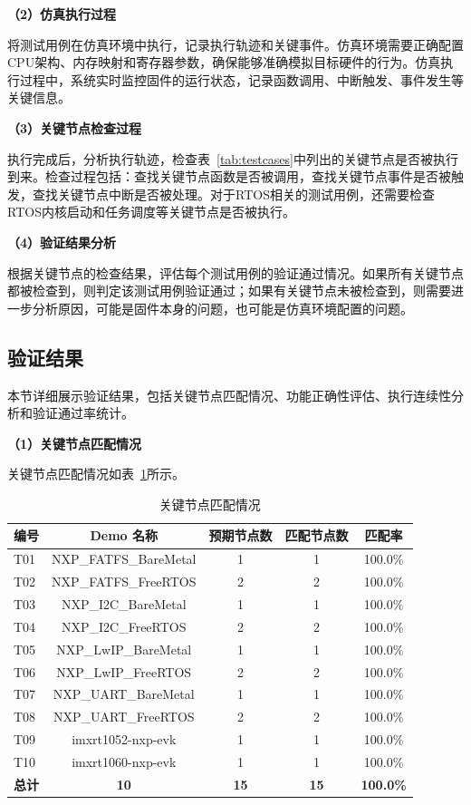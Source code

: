 \textbf{（2）仿真执行过程}

将测试用例在仿真环境中执行，记录执行轨迹和关键事件。仿真环境需要正确配置CPU架构、内存映射和寄存器参数，确保能够准确模拟目标硬件的行为。仿真执行过程中，系统实时监控固件的运行状态，记录函数调用、中断触发、事件发生等关键信息。

\textbf{（3）关键节点检查过程}

执行完成后，分析执行轨迹，检查表~\ref{tab:testcases}中列出的关键节点是否被执行到来。检查过程包括：查找关键节点函数是否被调用，查找关键节点事件是否被触发，查找关键节点中断是否被处理。对于RTOS相关的测试用例，还需要检查RTOS内核启动和任务调度等关键节点是否被执行。

\textbf{（4）验证结果分析}

根据关键节点的检查结果，评估每个测试用例的验证通过情况。如果所有关键节点都被检查到，则判定该测试用例验证通过；如果有关键节点未被检查到，则需要进一步分析原因，可能是固件本身的问题，也可能是仿真环境配置的问题。

\subsection{验证结果}

本节详细展示验证结果，包括关键节点匹配情况、功能正确性评估、执行连续性分析和验证通过率统计。

\textbf{（1）关键节点匹配情况}

关键节点匹配情况如表~\ref{tab:match_results}所示。

\begin{table}[htbp]
\centering
\caption{关键节点匹配情况}
\label{tab:match_results}
\begin{tabular}{lcccc}
\toprule
\textbf{编号} & \textbf{Demo 名称} & \textbf{预期节点数} & \textbf{匹配节点数} & \textbf{匹配率} \\
\midrule
T01 & NXP\_FATFS\_BareMetal & 1 & 1 & 100.0\% \\
T02 & NXP\_FATFS\_FreeRTOS & 2 & 2 & 100.0\% \\
T03 & NXP\_I2C\_BareMetal & 1 & 1 & 100.0\% \\
T04 & NXP\_I2C\_FreeRTOS & 2 & 2 & 100.0\% \\
T05 & NXP\_LwIP\_BareMetal & 1 & 1 & 100.0\% \\
T06 & NXP\_LwIP\_FreeRTOS & 2 & 2 & 100.0\% \\
T07 & NXP\_UART\_BareMetal & 1 & 1 & 100.0\% \\
T08 & NXP\_UART\_FreeRTOS & 2 & 2 & 100.0\% \\
T09 & imxrt1052-nxp-evk & 1 & 1 & 100.0\% \\
T10 & imxrt1060-nxp-evk & 1 & 1 & 100.0\% \\
\midrule
\textbf{总计} & \textbf{10} & \textbf{15} & \textbf{15} & \textbf{100.0\%} \\
\bottomrule
\end{tabular}
\end{table}

